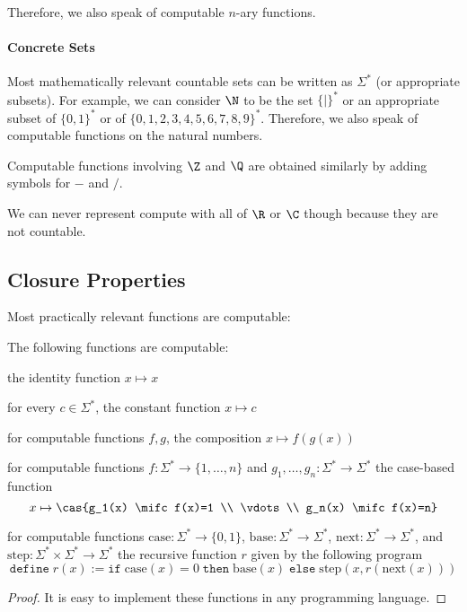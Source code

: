 Therefore, we also speak of computable $n$-ary functions.

\paragraph{Concrete Sets}
Most mathematically relevant countable sets can be written as $\Sigma^*$ (or appropriate subsets).
For example, we can consider $\N$ to be the set $\{|\}^*$ or an appropriate subset of $\{0,1\}^*$ or of $\{0,1,2,3,4,5,6,7,8,9\}^*$.
Therefore, we also speak of computable functions on the natural numbers.

Computable functions involving $\Z$ and $\Q$ are obtained similarly by adding symbols for $-$ and $/$.

We can never represent compute with all of $\R$ or $\C$ though because they are not countable.

\subsection{Closure Properties}\label{sec:comp:algo:prop}

Most practically relevant functions are computable:

\begin{theorem}\label{thm:comp:comp}
The following functions are computable:
\begin{compactitem}
\item the identity function $x\mapsto x$
\item for every $c\in\Sigma^*$, the constant function $x\mapsto c$
\item for computable functions $f,g$, the composition $x\mapsto f(g(x))$
\item for computable functions $f:\Sigma^*\to \{1,\ldots,n\}$ and $g_1,\ldots,g_n:\Sigma^*\to\Sigma^*$ the case-based function
\[x\mapsto \cas{g_1(x) \mifc f(x)=1 \\ \vdots\\ g_n(x) \mifc f(x)=n}\]
\item for computable functions $\mathrm{case}:\Sigma^*\to \{0,1\}$, $\mathrm{base}:\Sigma^*\to\Sigma^*$, $\mathrm{next}:\Sigma^*\to\Sigma^*$, and $\mathrm{step}:\Sigma^*\times\Sigma^*\to\Sigma^*$ the recursive function $r$ given by the following program
 \[\mathtt{define}\; r(x) := \mathtt{if}\; \mathrm{case}(x)=0\; \mathtt{then}\; \mathrm{base}(x) \;\mathtt{else}\; \mathrm{step}(x,r(\mathrm{next}(x)))\]
\end{compactitem}
\end{theorem}
\begin{proof}
It is easy to implement these functions in any programming language.
\end{proof}

